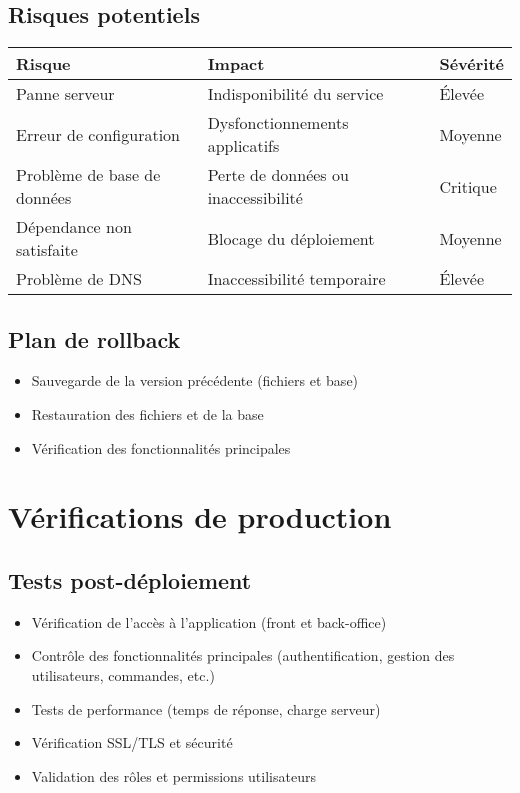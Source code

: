 \documentclass[a4paper,12pt]{report}
\begin{document}
\subsection{Risques potentiels}
\begin{longtable}{|L{4cm}|L{6cm}|L{4cm}|}
\hline
\textbf{Risque} & \textbf{Impact} & \textbf{Sévérité} \\
\hline
Panne serveur & Indisponibilité du service & Élevée \\
\hline
Erreur de configuration & Dysfonctionnements applicatifs & Moyenne \\
\hline
Problème de base de données & Perte de données ou inaccessibilité & Critique \\
\hline
Dépendance non satisfaite & Blocage du déploiement & Moyenne \\
\hline
Problème de DNS & Inaccessibilité temporaire & Élevée \\
\hline
\end{longtable}

\subsection{Plan de rollback}
\begin{itemize}
  \item Sauvegarde de la version précédente (fichiers et base)
  \item Restauration des fichiers et de la base
  \item Vérification des fonctionnalités principales
\end{itemize}

\section{Vérifications de production}
\subsection{Tests post-déploiement}
\begin{itemize}
  \item Vérification de l’accès à l’application (front et back-office)
  \item Contrôle des fonctionnalités principales (authentification, gestion des utilisateurs, commandes, etc.)
  \item Tests de performance (temps de réponse, charge serveur)
  \item Vérification SSL/TLS et sécurité
  \item Validation des rôles et permissions utilisateurs
\end{itemize}
\end{document}

